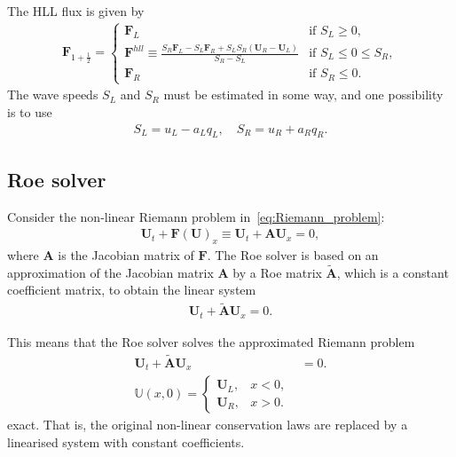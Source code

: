 The HLL flux is given by
\begin{align*}
    \mathbf{F}_{1 + \frac{1}{2}} = \begin{cases}
        \mathbf{F}_L & \text{if } S_L \geq 0, \\
        \mathbf{F}^{hll} \equiv \frac{S_R \mathbf{F}_L - S_L \mathbf{F}_R + S_L S_R (\mathbf{U}_R - \mathbf{U}_L)}{S_R - S_L} & \text{if } S_L \leq 0 \leq S_R, \\
        \mathbf{F}_R & \text{if } S_R \leq 0.
    \end{cases}
\end{align*}
The wave speeds $S_L$ and $S_R$ must be estimated in some way, and one possibility is to use 
\begin{align*}
    S_L = u_L - a_L q_L, \quad S_R = u_R + a_R q_R.
\end{align*}

\subsection{Roe solver}
Consider the non-linear Riemann problem in~\eqref{eq:Riemann_problem}:
\begin{align*}
    \mathbf{U}_t + \mathbf{F(U)}_x \equiv \mathbf{U}_t + \mathbf{A} \mathbf{U}_x = 0,
\end{align*}
where $\mathbf{A}$ is the Jacobian matrix of $\mathbf{F}$. 
The Roe solver is based on an approximation of the Jacobian matrix $\mathbf{A}$ by a Roe matrix $\tilde{\mathbf{A}}$, which is a constant coefficient matrix, to obtain the linear system
\begin{align*}
    \mathbf{U}_t + \mathbf{\tilde{A}} \mathbf{U}_x = 0.
\end{align*}

This means that the Roe solver solves the approximated Riemann problem
\begin{align*}
    \mathbf{U}_t + \mathbf{\tilde{A}} \mathbf{U}_x &= 0. \\
    \mathbb{U}(x,0) = \begin{cases}
        \mathbf{U}_L, & x < 0, \\
        \mathbf{U}_R, & x > 0.
    \end{cases}
\end{align*}
exact.
That is, the original non-linear conservation laws are replaced by a linearised system with constant coefficients.

